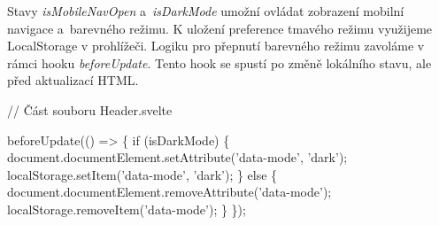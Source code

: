 Stavy \emph{isMobileNavOpen} a~\emph{isDarkMode} umožní ovládat zobrazení mobilní navigace a~barevného režimu. K uložení preference tmavého režimu využijeme LocalStorage v prohlížeči. 
Logiku pro přepnutí barevného režimu zavoláme v rámci hooku \emph{beforeUpdate}. Tento hook se spustí po změně lokálního stavu, ale před aktualizací HTML.

\begin{prog}
// Část souboru Header.svelte

beforeUpdate(() => \{
  if (isDarkMode) \{
    document.documentElement.setAttribute('data-mode', 'dark');
    localStorage.setItem('data-mode', 'dark');
  \} else \{
    document.documentElement.removeAttribute('data-mode');
    localStorage.removeItem('data-mode');
  \}
\});
\end{prog}